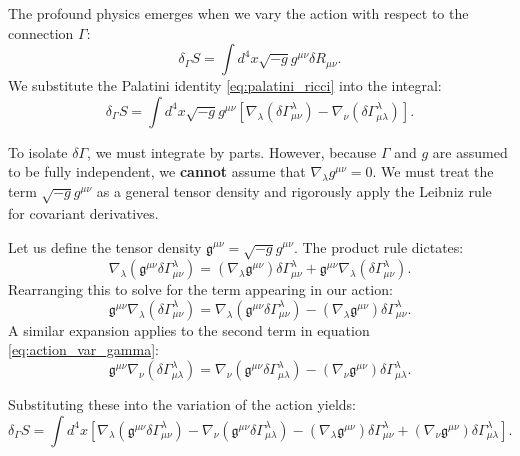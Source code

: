 \documentclass[11pt, a4paper]{report}
\begin{document}
The profound physics emerges when we vary the action with respect to the connection $\Gamma$:
\begin{equation}
\delta_{\Gamma} S = \int d^{4}x \sqrt{-g} g^{\mu\nu} \delta R_{\mu\nu}.
\end{equation}
We substitute the Palatini identity \eqref{eq:palatini_ricci} into the integral:
\begin{equation}
\label{eq:action_var_gamma}
\delta_{\Gamma} S = \int d^{4}x \sqrt{-g} g^{\mu\nu} \left[ \nabla_{\lambda}(\delta\Gamma^{\lambda}_{\mu\nu}) - \nabla_{\nu}(\delta\Gamma^{\lambda}_{\mu\lambda}) \right].
\end{equation}

To isolate $\delta\Gamma$, we must integrate by parts. However, because $\Gamma$ and $g$ are assumed to be fully independent, we \textbf{cannot} assume that $\nabla_{\lambda}g^{\mu\nu} = 0$. We must treat the term $\sqrt{-g} g^{\mu\nu}$ as a general tensor density and rigorously apply the Leibniz rule for covariant derivatives.

Let us define the tensor density $\mathfrak{g}^{\mu\nu} = \sqrt{-g} g^{\mu\nu}$. The product rule dictates:
\begin{equation}
\nabla_{\lambda}(\mathfrak{g}^{\mu\nu}\delta\Gamma^{\lambda}_{\mu\nu}) = (\nabla_{\lambda}\mathfrak{g}^{\mu\nu})\delta\Gamma^{\lambda}_{\mu\nu} + \mathfrak{g}^{\mu\nu}\nabla_{\lambda}(\delta\Gamma^{\lambda}_{\mu\nu}).
\end{equation}
Rearranging this to solve for the term appearing in our action:
\begin{equation}
\mathfrak{g}^{\mu\nu}\nabla_{\lambda}(\delta\Gamma^{\lambda}_{\mu\nu}) = \nabla_{\lambda}(\mathfrak{g}^{\mu\nu}\delta\Gamma^{\lambda}_{\mu\nu}) - (\nabla_{\lambda}\mathfrak{g}^{\mu\nu})\delta\Gamma^{\lambda}_{\mu\nu}.
\end{equation}
A similar expansion applies to the second term in equation \eqref{eq:action_var_gamma}:
\begin{equation}
\mathfrak{g}^{\mu\nu}\nabla_{\nu}(\delta\Gamma^{\lambda}_{\mu\lambda}) = \nabla_{\nu}(\mathfrak{g}^{\mu\nu}\delta\Gamma^{\lambda}_{\mu\lambda}) - (\nabla_{\nu}\mathfrak{g}^{\mu\nu})\delta\Gamma^{\lambda}_{\mu\lambda}.
\end{equation}

Substituting these into the variation of the action yields:
\begin{equation}
\delta_{\Gamma} S = \int d^{4}x \left[ \nabla_{\lambda}(\mathfrak{g}^{\mu\nu}\delta\Gamma^{\lambda}_{\mu\nu}) - \nabla_{\nu}(\mathfrak{g}^{\mu\nu}\delta\Gamma^{\lambda}_{\mu\lambda}) - (\nabla_{\lambda}\mathfrak{g}^{\mu\nu})\delta\Gamma^{\lambda}_{\mu\nu} + (\nabla_{\nu}\mathfrak{g}^{\mu\nu})\delta\Gamma^{\lambda}_{\mu\lambda} \right].
\end{equation}
\end{document}
